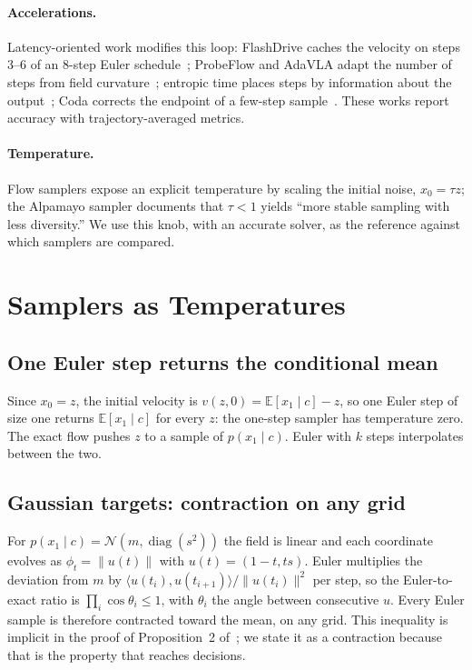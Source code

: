 \documentclass{article}
\theoremstyle{plain}
\theoremstyle{definition}
\theoremstyle{remark}
\newcommand{\E}{\mathbb{E}}
\begin{document}
\paragraph{Accelerations.} Latency-oriented work modifies this loop: FlashDrive caches the velocity on steps 3--6 of an 8-step Euler schedule~\citep{flashdrive2026}; ProbeFlow and AdaVLA adapt the number of steps from field curvature~\citep{probeflow2026,adavla2026}; entropic time places steps by information about the output~\citep{stancevic2025entropic}; Coda corrects the endpoint of a few-step sample~\citep{coda2026}. These works report accuracy with trajectory-averaged metrics.

\paragraph{Temperature.} Flow samplers expose an explicit temperature by scaling the initial noise, $x_0=\tau z$; the Alpamayo sampler documents that $\tau<1$ yields ``more stable sampling with less diversity.'' We use this knob, with an accurate solver, as the reference against which samplers are compared.

\section{Samplers as Temperatures}
\label{sec:theory}

\subsection{One Euler step returns the conditional mean}
Since $x_0=z$, the initial velocity is $v(z,0)=\E[x_1\mid c]-z$, so one Euler step of size one returns $\E[x_1\mid c]$ for every $z$: the one-step sampler has temperature zero. The exact flow pushes $z$ to a sample of $p(x_1\mid c)$. Euler with $k$ steps interpolates between the two.

\subsection{Gaussian targets: contraction on any grid}
For $p(x_1\mid c)=\mathcal{N}(m,\operatorname{diag}(s^2))$ the field is linear and each coordinate evolves as $\phi_t=\|u(t)\|$ with $u(t)=(1-t,ts)$. Euler multiplies the deviation from $m$ by $\langle u(t_i),u(t_{i+1})\rangle/\|u(t_i)\|^2$ per step, so the Euler-to-exact ratio is $\prod_i\cos\theta_i\le1$, with $\theta_i$ the angle between consecutive $u$. Every Euler sample is therefore contracted toward the mean, on any grid. This inequality is implicit in the proof of Proposition~2 of~\citet{claustre2026gaussian}; we state it as a contraction because that is the property that reaches decisions.
\end{document}
